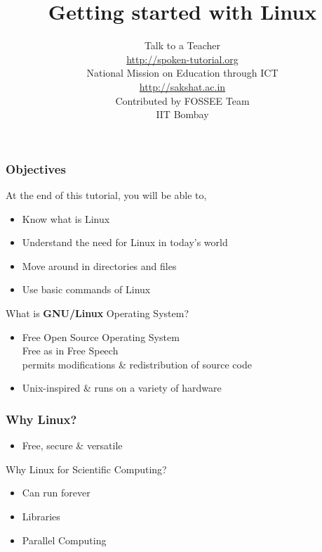 \documentclass[17pt,compress]{beamer}
\author[FOSSEE]{}
\institute[IIT Bombay]{}
\date[]{}
\begin{document}
\sffamily \bfseries
\title
[Getting started with Linux]
{Getting started with Linux}
\author
[FOSSEE]
{\small Talk to a Teacher\\{\color{blue}\url{http://spoken-tutorial.org}}\\\vspace{0.25cm}National Mission on Education
 through ICT\\{\color{blue}\url{ http://sakshat.ac.in}} \\ [1.65cm]
   Contributed by FOSSEE Team \\IIT Bombay  \\[0.3cm]
}

\begin{frame}
   \titlepage
\end{frame}

\begin{frame}
\frametitle{Objectives}
\label{sec-2}

At the end of this tutorial, you will be able to,
\begin{itemize}
\item Know what is Linux
\item Understand the need for Linux in today's world
\item Move around in directories and files
\item Use basic commands of Linux
\end{itemize}
\end{frame}

\begin{frame}[fragile]
  \begin{block}{What is \textbf{GNU/Linux} Operating System?}
    \begin{itemize}
    \item Free Open Source Operating System\\
      {\color{LimeGreen}{Free}} Free as in Free Speech\\
      {\color{LimeGreen}{Open-Source}} permits modifications \& redistribution of source code
      \item Unix-inspired \& runs on a variety of hardware
    \end{itemize}
  \end{block}
\end{frame}

\begin{frame}[fragile]
  \frametitle{Why Linux?}
    \begin{itemize}
    \item Free, secure \& versatile
    \end{itemize}

    \begin{block}{Why Linux for Scientific Computing?}
      \begin{itemize}
        \item Can run forever
        \item Libraries
        \item Parallel Computing
      \end{itemize}
    \end{block}
\end{frame}
\end{document}
